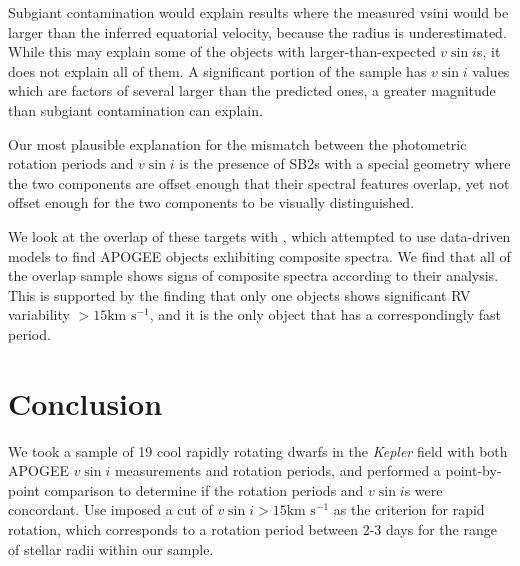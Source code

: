 \documentclass[manuscript]{aastex6}
\newcommand{\vsini}{\ensuremath{v \sin i}}
\newcommand{\Kepler}{\mbox{\textit{Kepler}}}
\newcommand{\kms}{\textrm{km~s}\ensuremath{^{-1}}}
\newcommand{\gvs}{\authorcomment1}
\begin{document}
Subgiant contamination would explain results where the measured vsini would be
larger than the inferred equatorial velocity, because the radius is
underestimated. While this may explain some of the objects with
larger-than-expected \vsini{}s, it does not explain all of them. A significant
portion of the sample has \vsini{} values which are factors of several larger
than the predicted ones, a greater magnitude than subgiant contamination can 
explain.

Our most plausible explanation for the mismatch between the photometric
rotation periods and \vsini{} is the presence of SB2s with a special geometry
where the two components are offset enough that their spectral features
overlap, yet not offset enough for the two components to be visually
distinguished. 

We look at the overlap of these targets with \citep{ElBadry18}, which attempted
to use data-driven models to find APOGEE objects exhibiting composite spectra. We 
find that all of the overlap sample shows signs of composite spectra according
to their analysis. This is supported by the finding that only one 
objects shows significant RV variability \(> 15 \kms\), and it is \gvs{one of} 
the only object that has a correspondingly fast period.




\section{Conclusion}
\label{sec:conclusions}

We took a sample of 19 cool rapidly rotating dwarfs in the \Kepler{} field with 
both APOGEE \vsini{} measurements and \citet{McQuillan14} rotation periods, and 
performed a point-by-point comparison to determine if the rotation periods and
\vsini{}s were concordant. Use imposed a cut of \(\vsini > 15 \kms\) as the
criterion for rapid rotation, which corresponds to a rotation period between
2-3 days for the range of stellar radii within our sample.
\end{document}
